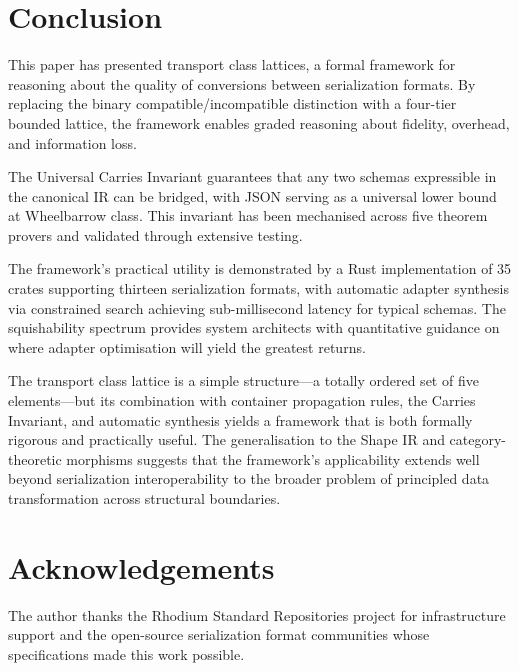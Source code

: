 \documentclass[11pt,a4paper]{article}
\theoremstyle{definition}
\theoremstyle{remark}
\begin{document}
\section{Conclusion}\label{sec:conclusion}

This paper has presented transport class lattices, a formal framework
for reasoning about the quality of conversions between serialization
formats. By replacing the binary compatible/incompatible distinction
with a four-tier bounded lattice, the framework enables graded
reasoning about fidelity, overhead, and information loss.

The Universal Carries Invariant guarantees that any two schemas
expressible in the canonical IR can be bridged, with JSON serving as
a universal lower bound at Wheelbarrow class. This invariant has been
mechanised across five theorem provers and validated through extensive
testing.

The framework's practical utility is demonstrated by a Rust
implementation of 35 crates supporting thirteen serialization
formats, with automatic adapter synthesis via constrained search
achieving sub-millisecond latency for typical schemas. The
squishability spectrum provides system architects with quantitative
guidance on where adapter optimisation will yield the greatest
returns.

The transport class lattice is a simple structure---a totally ordered
set of five elements---but its combination with container propagation
rules, the Carries Invariant, and automatic synthesis yields a
framework that is both formally rigorous and practically useful. The
generalisation to the Shape IR and category-theoretic morphisms
suggests that the framework's applicability extends well beyond
serialization interoperability to the broader problem of principled
data transformation across structural boundaries.

\section*{Acknowledgements}

The author thanks the Rhodium Standard Repositories project for
infrastructure support and the open-source serialization format
communities whose specifications made this work possible.


\end{document}
